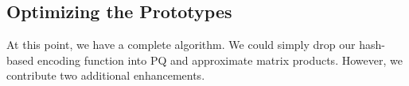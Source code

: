 

\vspace{-1.5mm}
\subsection{Optimizing the Prototypes}
\vspace{-.5mm}

At this point, we have a complete algorithm. We could simply drop our hash-based encoding function into PQ and approximate matrix products. However, we contribute two additional enhancements.

